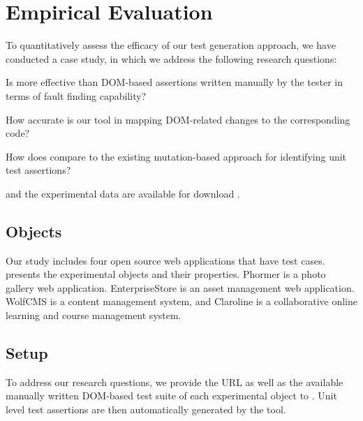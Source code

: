 \section{Empirical Evaluation} \label{Sec:evaluation}
To quantitatively assess the efficacy of our test generation approach, we have conducted a case study, in which we address the following research questions:

\begin{description}[noitemsep]
\item [RQ1] Is \tool more effective than DOM-based assertions written manually by the tester in terms of fault finding capability?
\item [RQ2] How accurate is our tool in mapping DOM-related changes to the corresponding \javascript code?
\item [RQ3] How does \tool compare to the existing mutation-based approach for identifying unit test assertions?
\end{description}

\tool and the experimental data are available for download \cite{atrina-dl}.
\subsection{Objects}
Our study includes four open source \javascript web applications that have \selenium test cases.  presents the experimental objects and their properties. Phormer \cite{phormer} is a photo gallery web application. EnterpriseStore \cite{enterpriseStore} is an asset management web application. WolfCMS \cite{wolfcms} is a content management system, and Claroline \cite{claroline} is a collaborative online learning and course management system. 

\subsection{Setup} \label{Sec:setup}
To address our research questions, we provide the URL as well as the available manually written DOM-based test suite of each experimental object to \tool. Unit level test assertions are then automatically generated by the tool.

